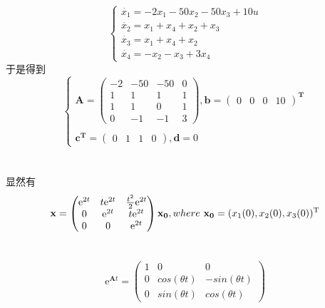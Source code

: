 \documentclass[UTF8,a4paper]{ctexart}
\begin{document}
\section{}
$$\begin{cases}
\dot{x_1}=-2x_1-50x_2-50x_3+10u\\
\dot{x_2}=x_1+x_4+x_2+x_3\\
\dot{x_3}=x_1+x_4+x_2\\
\dot{x_4}=-x_2-x_3+3x_4
\end{cases}$$
于是得到
$$\begin{cases}
\mathbf{A}=\begin{pmatrix}
-2&-50&-50&0\\
1&1&1&1\\
1&1&0&1\\
0&-1&-1&3\end{pmatrix},
\mathbf{b}=\begin{pmatrix} 0&0&0&10\end{pmatrix}^\mathbf{T} \\ \\ 
\mathbf{c}^\mathbf{T}=\begin{pmatrix} 0&1&1&0\end{pmatrix},
\mathbf{d}=0 \end{cases} $$
\section{}
显然有$$\mathbf{x}=\begin{pmatrix}
\mathrm{e}^{2t} & t\mathrm{e}^{2t} & \frac{t^2}{2}\mathrm{e}^{2t} \\
0 & \mathrm{e}^{2t} & t\mathrm{e}^{2t} \\
0 &0 & \mathrm{e}^{2t} 
\end{pmatrix}\mathbf{x_0},where\  \mathbf{x_0}=(x_1(0),x_2(0),x_3(0))^{\rm{T}}$$
\section{}
$$\mathrm{e}^{\mathbf{A}t}=\begin{pmatrix}
1 & 0 & 0 \\
0& cos(\theta t) & -sin(\theta t)\\
0&sin(\theta t) &cos(\theta t)
\end{pmatrix}$$
\end{document}
